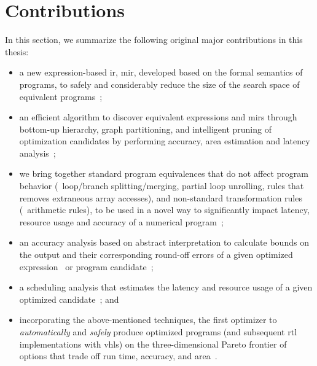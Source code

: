 \section{Contributions}
\label{intro:sec:contributions}

In this section, we summarize the following original major contributions in
this thesis:
\begin{itemize}

    \item a new expression-based \gls{ir}, \acrfull{mir}, developed based on
    the formal semantics of programs, to safely and considerably reduce the
    size of the search space of equivalent programs~\cite{soap2};

    \item an efficient algorithm to discover equivalent expressions and
    \glspl{mir} through bottom-up hierarchy, graph partitioning, and
    intelligent pruning of optimization candidates by performing accuracy, area
    estimation and latency analysis~\cite{soap};

    \item we bring together standard program equivalences that do not affect
    program behavior (\eg~loop/branch splitting/merging, partial loop
    unrolling, rules that removes extraneous array accesses), and non-standard
    transformation rules (\eg~arithmetic rules), to be used in a novel way to
    significantly impact latency, resource usage and accuracy of a numerical
    program~\cite{soap3};

    \item an accuracy analysis based on abstract interpretation to calculate
    bounds on the output and their corresponding round-off errors of a given
    optimized expression~\cite{soap} or program candidate~\cite{soap2};

    \item a scheduling analysis that estimates the latency and resource usage
    of a given optimized candidate~\cite{soap3}; and

    \item incorporating the above-mentioned techniques, the first optimizer
    to \emph{automatically} and \emph{safely} produce optimized programs
    (and subsequent \gls{rtl} implementations with \gls{vhls}) on the
    three-dimensional Pareto frontier of options that trade off run time,
    accuracy, and area~\cite{soap3}.

\end{itemize}
